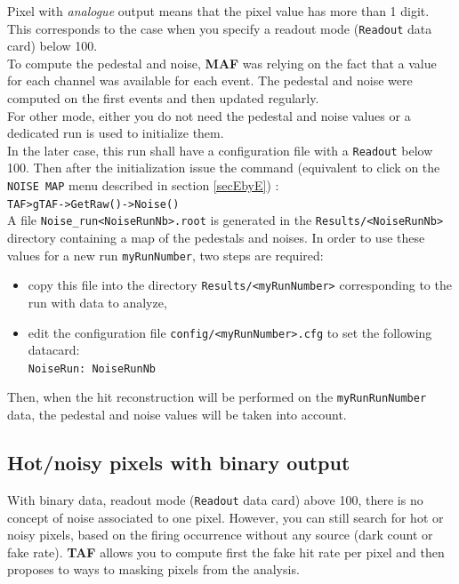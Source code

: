 \documentclass[a4paper, 12pt, twoside]{article}
\newcommand{\TAF}{{\bf TAF }}
\newcommand{\MAF}{{\bf MAF }}
\begin{document}
Pixel with {\it analogue} output means that the pixel value has more than 1 digit. This corresponds to the case when you specify a readout mode ({\tt Readout} data card) below 100.\\
To compute the pedestal and noise, \MAF  was relying on the fact that a value for each channel was available for each event. The pedestal and noise were computed on the first events and then updated regularly.\\
For other mode, either you do not need the pedestal and noise values or a dedicated run is used to initialize them.\\
In the later case, this run shall have a configuration file with a {\tt Readout} below 100. Then after the initialization issue the command (equivalent to click on the {\tt NOISE MAP} menu described in section \ref{secEbyE}) :\\
\noindent
{\tt TAF>gTAF->GetRaw()->Noise()}\\

\noindent
A file {\tt Noise\_run<NoiseRunNb>.root} is generated in the {\tt Results/<NoiseRunNb>} directory containing a map of the pedestals and noises. In order to use these values for a new run {\tt myRunNumber}, two steps are required:
\begin{itemize}
\item copy this file into the directory {\tt Results/<myRunNumber>} corresponding to the run with data to analyze,
\item edit the configuration file {\tt config/<myRunNumber>.cfg} to set the following datacard:\\
{\tt NoiseRun:        NoiseRunNb}
\end{itemize}
Then, when the hit reconstruction will be performed on the {\tt myRunRunNumber} data, the pedestal and noise values will be taken into account.


\subsection{Hot/noisy pixels with binary output}
\label{subsec:binaryNoise}

With binary data, readout mode ({\tt Readout} data card) above 100, there is no concept of noise associated to one pixel. However, you can still search for hot or noisy pixels, based on the firing occurrence without any source (dark count or fake rate). \TAF allows you to compute first the fake hit rate per pixel and then proposes to ways to masking pixels from the analysis.\\
\end{document}
